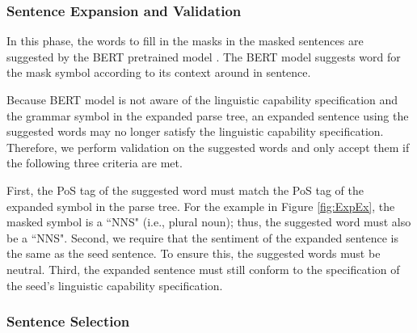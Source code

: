 \subsubsection{Sentence Expansion and Validation}

In this phase, the words to fill in the masks in the masked sentences
are suggested by the BERT pretrained model \cite{}.  The BERT model
suggests word for the mask symbol according to its context  around in sentence.    

Because BERT model is not aware of the linguistic capability
specification and the grammar symbol in the expanded parse tree, an
expanded sentence using the suggested words may no longer satisfy the
linguistic capability specification. Therefore, we perform validation
on the suggested words and only accept them if the following three
criteria are met.

First, the PoS tag of the suggested word must match the PoS tag of the
expanded symbol in the parse tree. For the example in Figure
\ref{fig:ExpEx}, the masked symbol is a ``NNS" (i.e., plural noun);
thus, the suggested word must also be a ``NNS".   
Second, we require that the sentiment of the expanded sentence is the
same as the seed sentence. To ensure this, the suggested words must be
neutral.    Third, the expanded sentence must still conform to
the specification of the seed's linguistic capability specification.


\subsubsection{Sentence Selection}

